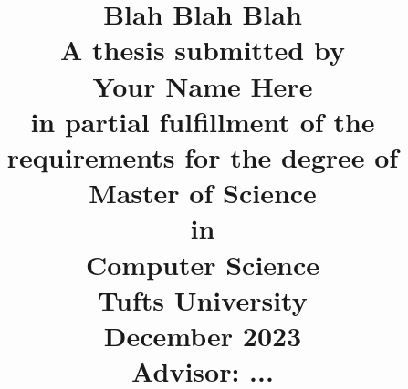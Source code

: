 \documentclass[12pt]{report}
\begin{document}
\title{
  {\Large \textbf{Blah Blah Blah}}\\
  {\normalsize A thesis submitted by}\\
  {\large Your Name Here}\\
  {\normalsize in partial fulfillment of the requirements for the degree of}\\
  {\normalsize Master of Science}\\
  {\normalsize in}\\
  {\normalsize Computer Science}\\
  \vspace{4cm}
  {\normalsize Tufts University}\\
  {\normalsize December 2023}\\
  {\normalsize Advisor: ...}
  \date{}
}

\maketitle










\appendix 



\cleardoublepage %
\printbibliography[title={Bibliography},heading=bibintoc] %
\end{document}
